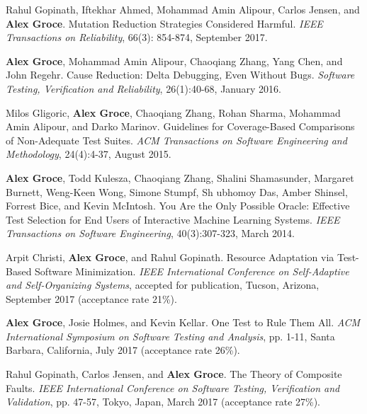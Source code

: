 \documentclass[ComputerScience,10pt]{vita}
\begin{document}
\begin{vita}
\begin{Selected Recent Journal Publications}
\item
Rahul Gopinath, Iftekhar Ahmed, Mohammad Amin Alipour, Carlos Jensen, and {\bf Alex Groce}.
\newblock Mutation Reduction Strategies Considered Harmful.
\newblock \emph{IEEE Transactions on Reliability}, 66(3): 854-874, September 2017.

\item
{\bf Alex Groce}, Mohammad Amin Alipour, Chaoqiang Zhang, Yang Chen, and John Regehr.
\newblock Cause Reduction: Delta Debugging, Even Without Bugs.
\newblock \emph{Software Testing, Verification and Reliability}, 26(1):40-68, January 2016.

\item
Milos Gligoric, {\bf Alex Groce}, Chaoqiang Zhang, Rohan Sharma, Mohammad Amin Alipour, and Darko Marinov.
\newblock Guidelines for Coverage-Based Comparisons of Non-Adequate Test Suites.
\newblock \emph{ACM Transactions on Software Engineering and Methodology}, 24(4):4-37, August 2015.

\item
{\bf Alex Groce}, Todd Kulesza, Chaoqiang Zhang, Shalini Shamasunder, Margaret Burnett, Weng-Keen Wong, Simone Stumpf, Sh
ubhomoy Das, Amber Shinsel, Forrest Bice, and Kevin McIntosh.
\newblock You Are the Only Possible Oracle: Effective Test Selection for End Users of Interactive Machine Learning Systems.
\newblock \emph{IEEE Transactions on Software Engineering}, 40(3):307-323, March 2014.
\end{Selected Recent Journal Publications}

\begin{Selected Recent Conference Publications}
\item Arpit Christi, {\bf Alex Groce}, and Rahul Gopinath.
\newblock Resource Adaptation via Test-Based Software Minimization.
\newblock \emph{IEEE International Conference on Self-Adaptive and Self-Organizing Systems}, accepted for publication, Tucson, Arizona, September 2017 (acceptance rate 21\%).

\item {\bf Alex Groce}, Josie Holmes, and Kevin Kellar.
\newblock One Test to Rule Them All.
\newblock \emph{ACM International Symposium on Software Testing and Analysis}, pp. 1-11, Santa Barbara, California, July 2017 (acceptance rate 26\%).

\item Rahul Gopinath, Carlos Jensen, and {\bf Alex Groce}.
\newblock The Theory of Composite Faults.
\newblock \emph{IEEE International Conference on Software Testing, Verification and Validation}, pp. 47-57, Tokyo, Japan, March 2017 (acceptance rate 27\%).


\end{Selected Recent Conference Publications}
\end{vita}
\end{document}
